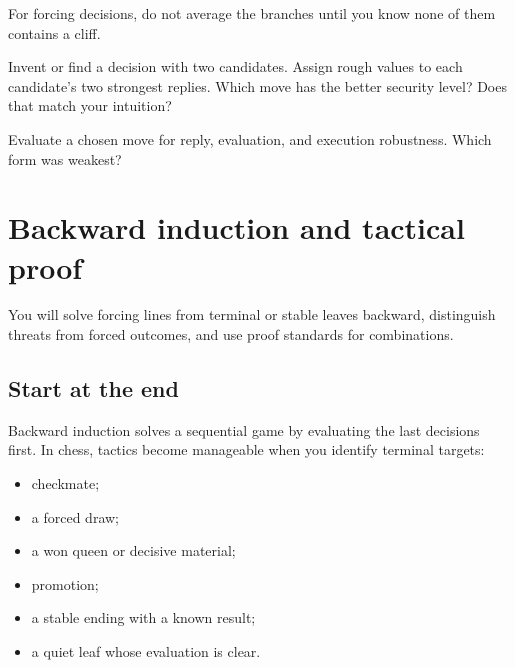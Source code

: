 \begin{memorybox}
For forcing decisions, do not average the branches until you know none of them contains a cliff.
\end{memorybox}

\begin{exercise}
Invent or find a decision with two candidates. Assign rough values to each candidate's two strongest replies. Which move has the better security level? Does that match your intuition?
\end{exercise}

\begin{exercise}
Evaluate a chosen move for reply, evaluation, and execution robustness. Which form was weakest?
\end{exercise}


\chapter{Backward induction and tactical proof}
\begin{learningbox}
You will solve forcing lines from terminal or stable leaves backward, distinguish threats from forced outcomes, and use proof standards for combinations.
\end{learningbox}

\section{Start at the end}
Backward induction solves a sequential game by evaluating the last decisions first. In chess, tactics become manageable when you identify terminal targets:

\begin{itemize}[leftmargin=1.4em]
\item checkmate;
\item a forced draw;
\item a won queen or decisive material;
\item promotion;
\item a stable ending with a known result;
\item a quiet leaf whose evaluation is clear.
\end{itemize}

